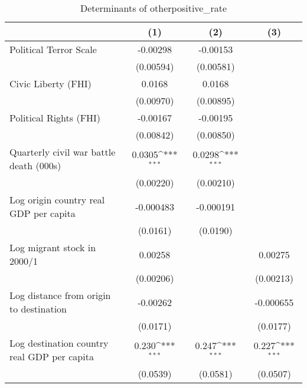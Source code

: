 \begin{table}[htbp]\centering
\def\sym#1{\ifmmode^{#1}\else\(^{#1}\)\fi}
\caption{Determinants of otherpositive\_rate}
\begin{tabular}{l*{3}{c}}
\hline\hline
                    &\multicolumn{1}{c}{(1)}         &\multicolumn{1}{c}{(2)}         &\multicolumn{1}{c}{(3)}         \\
\hline
Political Terror Scale&    -0.00298         &    -0.00153         &                     \\
                    &   (0.00594)         &   (0.00581)         &                     \\
[1em]
Civic Liberty (FHI) &      0.0168         &      0.0168         &                     \\
                    &   (0.00970)         &   (0.00895)         &                     \\
[1em]
Political Rights (FHI)&    -0.00167         &    -0.00195         &                     \\
                    &   (0.00842)         &   (0.00850)         &                     \\
[1em]
Quarterly civil war battle death (000s)&      0.0305\sym{***}&      0.0298\sym{***}&                     \\
                    &   (0.00220)         &   (0.00210)         &                     \\
[1em]
Log origin country real GDP per capita&   -0.000483         &   -0.000191         &                     \\
                    &    (0.0161)         &    (0.0190)         &                     \\
[1em]
Log migrant stock in 2000/1&     0.00258         &                     &     0.00275         \\
                    &   (0.00206)         &                     &   (0.00213)         \\
[1em]
Log distance from origin to destination&    -0.00262         &                     &   -0.000655         \\
                    &    (0.0171)         &                     &    (0.0177)         \\
[1em]
Log destination country real GDP per capita&       0.230\sym{***}&       0.247\sym{***}&       0.227\sym{***}\\
                    &    (0.0539)         &    (0.0581)         &    (0.0507)         \\

\end{tabular}
\end{table}
